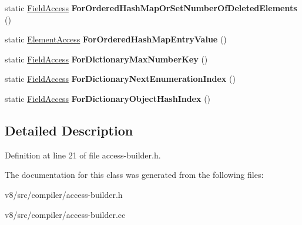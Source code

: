 \begin{DoxyCompactItemize}
\item 
\mbox{\label{classv8_1_1internal_1_1compiler_1_1AccessBuilder_af7caaf274bcab096927e632875478a54}} 
static \mbox{\hyperlink{structv8_1_1internal_1_1compiler_1_1FieldAccess}{Field\+Access}} {\bfseries For\+Ordered\+Hash\+Map\+Or\+Set\+Number\+Of\+Deleted\+Elements} ()
\item 
\mbox{\label{classv8_1_1internal_1_1compiler_1_1AccessBuilder_a713a7e496f3e73feb827315afc72da45}} 
static \mbox{\hyperlink{structv8_1_1internal_1_1compiler_1_1ElementAccess}{Element\+Access}} {\bfseries For\+Ordered\+Hash\+Map\+Entry\+Value} ()
\item 
\mbox{\label{classv8_1_1internal_1_1compiler_1_1AccessBuilder_aed1e7cf518a18e22693fd9ae22dccdf0}} 
static \mbox{\hyperlink{structv8_1_1internal_1_1compiler_1_1FieldAccess}{Field\+Access}} {\bfseries For\+Dictionary\+Max\+Number\+Key} ()
\item 
\mbox{\label{classv8_1_1internal_1_1compiler_1_1AccessBuilder_ab37cfb3951ce2f110e0e455fc9974ea2}} 
static \mbox{\hyperlink{structv8_1_1internal_1_1compiler_1_1FieldAccess}{Field\+Access}} {\bfseries For\+Dictionary\+Next\+Enumeration\+Index} ()
\item 
\mbox{\label{classv8_1_1internal_1_1compiler_1_1AccessBuilder_afb76f272df202f3d5fe7c8d3ff9a1441}} 
static \mbox{\hyperlink{structv8_1_1internal_1_1compiler_1_1FieldAccess}{Field\+Access}} {\bfseries For\+Dictionary\+Object\+Hash\+Index} ()
\end{DoxyCompactItemize}


\subsection{Detailed Description}


Definition at line 21 of file access-\/builder.\+h.



The documentation for this class was generated from the following files\+:\begin{DoxyCompactItemize}
\item 
v8/src/compiler/access-\/builder.\+h\item 
v8/src/compiler/access-\/builder.\+cc\end{DoxyCompactItemize}
